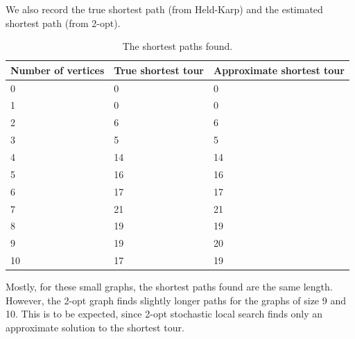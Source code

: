 \documentclass[10pt]{extarticle}
\begin{document}
We also record the true shortest path (from Held-Karp) and the estimated
shortest path (from 2-opt).

\begin{table}[ht]
    \centering
    \begin{tabular}{@{}lll@{}}
        \toprule
        Number of vertices & True shortest tour & Approximate shortest tour \\
        \midrule
        0 &	0 &	0 \\
        1 &	0 &	0 \\
        2 &	6 &	6 \\
        3 &	5 &	5 \\
        4 &	14& 14 \\
        5 &	16&	16 \\
        6 &	17&	17 \\
        7 &	21&	21 \\
        8 &	19&	19 \\
        9 &	19&	20 \\
        10&	17&	19 \\
        \bottomrule
    \end{tabular}
    \caption{The shortest paths found.}
    \label{tab:1}
\end{table}

Mostly, for these small graphs, the shortest paths found are the same length.
However, the 2-opt graph finds slightly longer paths for the graphs of size
9 and 10. This is to be expected, since 2-opt stochastic local search finds
only an approximate solution to the shortest tour.
\end{document}
